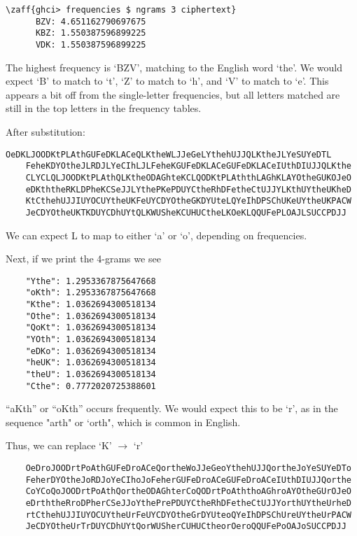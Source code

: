 \begin{Answer}
  \begin{Verbatim}[commandchars=\\\{\}]
    \zaff{ghci> frequencies $ ngrams 3 ciphertext}
      BZV: 4.651162790697675
      KBZ: 1.550387596899225
      VDK: 1.550387596899225
  \end{Verbatim}

  \noindent
  The highest frequency is `BZV', matching to the English word `the'.
  We would expect `B' to match to `t', `Z' to match to `h', and `V' to match to `e'.
  This appears a bit off from the single-letter frequencies, but all letters matched are
  still in the top letters in the frequency tables.

  \noindent
  After substitution:

  \begin{Verbatim}[commandchars=\\\{\}]
    OeDKLJOODKtPLAthGUFeDKLACeQLKtheWLJJeGeLYthehUJJQLKtheJLYeSUYeDTL
    FeheKDYOtheJLRDJLYeCIhLJLFeheKGUFeDKLACeGUFeDKLACeIUthDIUJJQLKthe
    CLYCLQLJOODKtPLAthQLKtheODAGhteKCLQODKtPLAththLAGhKLAYOtheGUKOJeO
    eDKththeRKLDPheKCSeJJLYthePKePDUYCtheRhDFetheCtUJJYLKthUYtheUKheD
    KtCthehUJJIUYOCUYtheUKFeUYCDYOtheGKDYUteLQYeIhDPSChUKeUYtheUKPACW
    JeCDYOtheUKTKDUYCDhUYtQLKWUSheKCUHUCtheLKOeKLQQUFePLOAJLSUCCPDJJ
  \end{Verbatim}

  \noindent
  We can expect L to map to either `a' or `o', depending on frequencies.

  \noindent
  Next, if we print the 4-grams we see
  \begin{Verbatim}
    "Ythe": 1.2953367875647668
    "oKth": 1.2953367875647668
    "Kthe": 1.0362694300518134
    "Othe": 1.0362694300518134
    "QoKt": 1.0362694300518134
    "YOth": 1.0362694300518134
    "eDKo": 1.0362694300518134
    "heUK": 1.0362694300518134
    "theU": 1.0362694300518134
    "Cthe": 0.7772020725388601
  \end{Verbatim}

  \noindent
  ``aKth'' or ``oKth'' occurs frequently. We would expect this to be
  `r', as in the sequence "arth" or `orth", which is common in English. 

  \noindent
  Thus, we can replace `K' $\rightarrow$ `r'

  \begin{Verbatim}
    OeDroJOODrtPoAthGUFeDroACeQortheWoJJeGeoYthehUJJQortheJoYeSUYeDTo
    FeherDYOtheJoRDJoYeCIhoJoFeherGUFeDroACeGUFeDroACeIUthDIUJJQorthe
    CoYCoQoJOODrtPoAthQortheODAGhterCoQODrtPoAththoAGhroAYOtheGUrOJeO
    eDrththeRroDPherCSeJJoYthePrePDUYCtheRhDFetheCtUJJYorthUYtheUrheD
    rtCthehUJJIUYOCUYtheUrFeUYCDYOtheGrDYUteoQYeIhDPSChUreUYtheUrPACW
    JeCDYOtheUrTrDUYCDhUYtQorWUSherCUHUCtheorOeroQQUFePoOAJoSUCCPDJJ
  \end{Verbatim}


\end{Answer}
